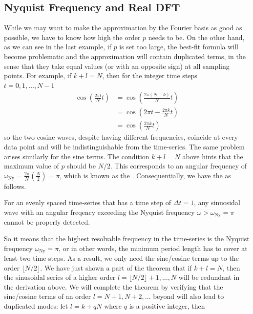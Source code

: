 \subsection{Nyquist Frequency and Real DFT}

While we may want to make the approximation by the Fourier basis as good as possible, we have to know how high the order $p$ needs to be. On the other hand, as we can see in the last example, if $p$ is set too large, the best-fit formula will become problematic and the approximation will contain duplicated terms, in the sense that they take equal values (or with an opposite sign) at all sampling points. For example, if $k + l = N$, then for the integer time steps $t = 0, 1, \ldots, N-1$
\begin{align*}
\cos(\frac{2\pi l}{N} t) &= \cos(\frac{2\pi (N-k)}{N} t) \\
&= \cos(2\pi t - \frac{2\pi k}{N} t) \\
&= \cos(\frac{2\pi k}{N} t)
\end{align*}
so the two cosine waves, despite having different frequencies, coincide at every data point and will be indistinguishable from the time-series. The same problem arises similarly for the sine terms. The condition $k + l = N$ above hints that the maximum value of $p$ should be $N/2$. This corresponds to an angular frequency of $\omega_{\text{Ny}} = \frac{2\pi}{N}(\frac{N}{2}) = \pi$, which is known as the . Consequentially, we have the  as follows.
\begin{thm}
\label{thm:Nyquist}
For an evenly spaced time-series that has a time step of $\Delta t = 1$, any sinuosidal wave with an angular freqency exceeding the Nyquist frequency $\omega > \omega_{\text{Ny}} = \pi$ cannot be properly detected. 
\end{thm}
So it means that the highest resolvable frequency in the time-series is the Nyquist frequency $\omega_{\text{Ny}} = \pi$, or in other words, the minimum period length has to cover at least two time steps. As a result, we only need the sine/cosine terms up to the order $\lfloor N/2 \rfloor$. We have just shown a part of the theorem that if $k + l = N$, then the sinusoidal series of a higher order $l = \lfloor N/2 \rfloor + 1, \ldots, N$ will be redundant in the derivation above. We will complete the theorem by verifying that the sine/cosine terms of an order $l = N+1, N+2, \ldots$ beyond will also lead to duplicated modes: let $l = k + qN$ where $q$ is a positive integer, then
